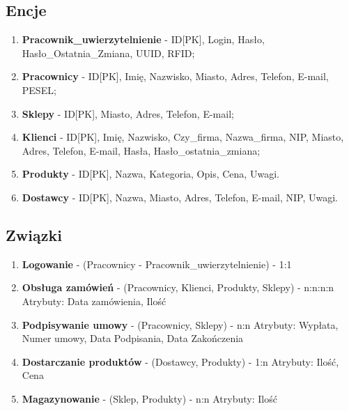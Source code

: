 \documentclass[12pt,a4paper]{article}
\begin{document}
        \subsection{Encje}
            \begin{enumerate}
                \item \textbf{Pracownik\_uwierzytelnienie} - ID[PK], Login, Hasło, Hasło\_Ostatnia\_Zmiana, UUID, RFID;
                \item \textbf{Pracownicy} - ID[PK], Imię, Nazwisko, Miasto, Adres, Telefon, E-mail, PESEL;
                \item \textbf{Sklepy} - ID[PK], Miasto, Adres, Telefon, E-mail;
                \item \textbf{Klienci} - ID[PK], Imię, Nazwisko, Czy\_firma, Nazwa\_firma, NIP, Miasto, Adres, Telefon, E-mail, Hasła, Hasło\_ostatnia\_zmiana;
                \item \textbf{Produkty} - ID[PK], Nazwa, Kategoria, Opis, Cena, Uwagi.
                \item \textbf{Dostawcy} - ID[PK], Nazwa, Miasto, Adres, Telefon, E-mail, NIP, Uwagi.
            \end{enumerate}
            
        \subsection{Związki}
            \begin{enumerate}
                \item \textbf{Logowanie} - (Pracownicy - Pracownik\_uwierzytelnienie) - 1:1
                \item \textbf{Obsługa zamówień} - (Pracownicy, Klienci, Produkty, Sklepy) - n:n:n:n \newline
                Atrybuty: Data zamówienia, Ilość 
                \item \textbf{Podpisywanie umowy} - (Pracownicy, Sklepy) - n:n \newline
                Atrybuty: Wypłata, Numer umowy, Data Podpisania, Data Zakończenia
                \item \textbf{Dostarczanie produktów} - (Dostawcy, Produkty) - 1:n \newline
                Atrybuty: Ilość, Cena
                \item \textbf{Magazynowanie} - (Sklep, Produkty) - n:n \newline
                Atrybuty: Ilość
            \end{enumerate}
\end{document}
